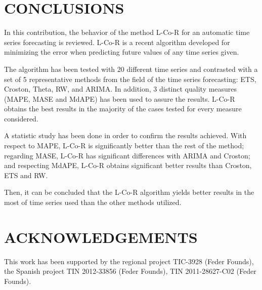 \documentclass[a4paper,twoside]{article}
\newcommand{\metodo}{L-Co-R}
\begin{document}
\section{\uppercase{Conclusions}}
\label{sec:conclusions}

\noindent In this contribution, the behavior of the method {\metodo} for an automatic time series forecasting is reviewed. {\metodo} is a recent algorithm developed for minimizing the error when predicting future values of any time series given. %

The algorithm has been tested with 20 different time series and%
contrasted with a set of 5 representative methods from the field of the time series forecasting: ETS, Croston, Theta, RW, and ARIMA. In addition, 3 distinct quality measures (MAPE, MASE and MdAPE) has been used to assure the results. {\metodo} obtains the best results in the majority of the cases tested for every measure considered.

A statistic study has been done in order to confirm the results achieved. %
With respect to MAPE, {\metodo} is significantly better than the rest of the method; regarding MASE, {\metodo} has significant differences with ARIMA and Croston; and respecting MdAPE, {\metodo} obtains significant better results than Croston, ETS and RW.

Then, it can be concluded that the {\metodo} algorithm yields better results in the most of time series used than the other methods utilized.






\section*{\uppercase{Acknowledgements}}

\noindent This work has been supported by the regional project TIC-3928 (Feder Founds), the Spanish project TIN 2012-33856 (Feder Founds), TIN 2011-28627-C02 (Feder Founds).



{\small
}




\vfill
\end{document}
